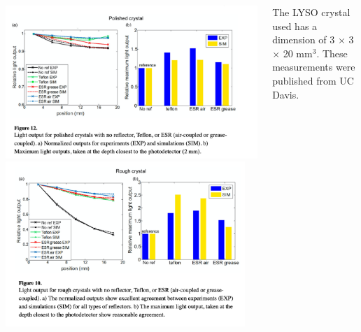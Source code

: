\documentclass[xcolor=x11names, compress, handout]{beamer}
\renewcommand{\(}{\begin{columns}}
\renewcommand{\)}{\end{columns}}
\newcommand{\<}[1]{\begin{column}{#1}}
\renewcommand{\>}{\end{column}}
\begin{document}
\begin{frame}
\begin{columns}
\begin{column}{0.6\textwidth}
\includegraphics[width=\textwidth, height=0.49\textheight]{images/lyso_polished.png}
\includegraphics[width=0.95\textwidth, height=0.49\textheight]{images/lyso_rough.png}
\end{column}
\begin{column}{0.39\textwidth}
\scriptsize
The LYSO crystal used has a dimension of 3 $\times$ 3 $\times$ 20 mm$^3$. These measurements were published from UC Davis.\cite{roncali_stockhoff_cherry_2017}


\end{column}
\end{columns}
\end{frame}
\end{document}
